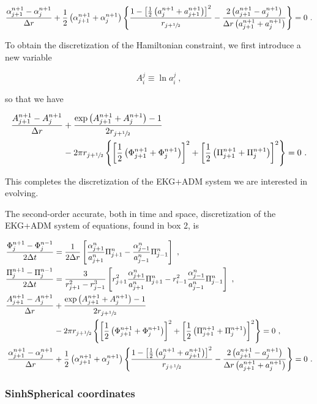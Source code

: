 \documentclass[a4paper,11pt]{article}
\renewcommand{\a}{\alpha}
\newcommand{\nn}{\nonumber}
\newcommand{\dt}{\Delta t}
\newcommand{\dr}{\Delta r}
\newcommand{\lrpar}[1]{\left( #1 \right)}
\newcommand{\lrsquare}[1]{\left[ #1 \right]}
\newcommand{\lrcurly}[1]{\left\{ #1 \right\}}
\newcommand{\n}{\noindent}
\newcommand{\eq}[1]{
  \begin{equation}
    #1
  \end{equation}
}
\newcommand{\al}[1]{
  \begin{align}
    #1
  \end{align}
}
\newcommand{\parboxbreak}[2]{
  
  \vspace*{0.25in}
  
  \begin{tcolorbox}[breakable, pad at break=1mm, before=\centering,title=Box #1,colback=blue!5!white,colframe=gray!75!black]
    #2
  \end{tcolorbox}

  \vspace*{0.25in}

}
\begin{document}
\eq{
  \frac{\a^{n+1}_{j+1}-\a^{n+1}_{j}}{\dr}+\frac{1}{2}\lrpar{\a^{n+1}_{j+1}+\a^{n+1}_{j}}\lrcurly{\frac{1-\lrsquare{\frac{1}{2}\lrpar{a^{n+1}_{j}+a^{n+1}_{j+1}}}^2}{r_{j+\sfrac{1}{2}}}-\frac{2\lrpar{a^{n+1}_{j+1}-a^{n+1}_{j}}}{\dr\lrpar{a^{n+1}_{j+1}+a^{n+1}_{j}}}}=0\ .
}

To obtain the discretization of the Hamiltonian constraint, we first introduce a new variable

\eq{ A^{j}_{i} \equiv \ln a^{j}_{i}\ , }

\n so that we have

\al{
\frac{A^{n+1}_{j+1}-A^{n+1}_{j}}{\dr}&+\frac{\exp\lrpar{A^{n+1}_{j+1}+A^{n+1}_{j}}-1}{2r_{j+\sfrac{1}{2}}}\nn\\
&-2\pi r_{j+\sfrac{1}{2}}\lrcurly{\lrsquare{\frac{1}{2}\lrpar{\Phi^{n+1}_{j+1}+\Phi^{n+1}_{j}}}^2+\lrsquare{\frac{1}{2}\lrpar{\Pi^{n+1}_{j+1}+\Pi^{n+1}_{j}}}^2}=0\ .
}

\n This completes the discretization of the EKG+ADM system we are interested in evolving.

\parboxbreak{3: The discretization of the EKG+ADM system of equations}{

  The second-order accurate, both in time and space, discretization of the EKG+ADM system of equations, found in box 2, is

  \al{
    \frac{\Phi^{n+1}_{j} - \Phi^{n-1}_{j}}{2\dt} &= \frac{1}{2\dr}\lrsquare{\frac{\a^{n}_{j+1}}{a^{n}_{j+1}}\Pi^{n}_{j+1} - \frac{\a^{n}_{j-1}}{a^{n}_{j-1}}\Pi^{n}_{j-1}}\ ,\nn\\
    \frac{\Pi^{n+1}_{j}  - \Pi^{n-1}_{j}}{2\dt}  &= \frac{3}{r_{j+1}^{2} - r_{j-1}^{3}}\lrsquare{r^{2}_{j+1}\frac{\a^{n}_{j+1}}{a^{n}_{j+1}}\Pi^{n}_{j+1} - r^{2}_{i-1}\frac{\a^{n}_{j-1}}{a^{n}_{j-1}}\Pi^{n}_{j-1}}\ ,\nn\\
    \frac{A^{n+1}_{j+1}-A^{n+1}_{j}}{\dr}&+\frac{\exp\lrpar{A^{n+1}_{j+1}+A^{n+1}_{j}}-1}{2r_{j+\sfrac{1}{2}}}\nn\\
    &-2\pi r_{j+\sfrac{1}{2}}\lrcurly{\lrsquare{\frac{1}{2}\lrpar{\Phi^{n+1}_{j+1}+\Phi^{n+1}_{j}}}^2+\lrsquare{\frac{1}{2}\lrpar{\Pi^{n+1}_{j+1}+\Pi^{n+1}_{j}}}^2}=0\ ,\nn\\
    \frac{\a^{n+1}_{j+1}-\a^{n+1}_{j}}{\dr}&+\frac{1}{2}\lrpar{\a^{n+1}_{j+1}+\a^{n+1}_{j}}\lrcurly{\frac{1-\lrsquare{\frac{1}{2}\lrpar{a^{n+1}_{j}+a^{n+1}_{j+1}}}^2}{r_{j+\sfrac{1}{2}}}-\frac{2\lrpar{a^{n+1}_{j+1}-a^{n+1}_{j}}}{\dr\lrpar{a^{n+1}_{j+1}+a^{n+1}_{j}}}}=0\ .\nn
  }
  
}

\subsubsection{SinhSpherical coordinates}
\end{document}
